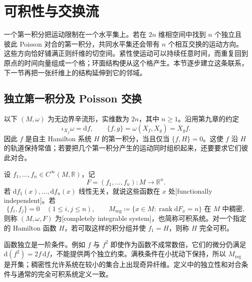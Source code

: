 
% 
% 

\section{可积性与交换流}
\label{g4:sec:1101}

一个第一积分把运动限制在一个水平集上。若在 \(2n\) 维相空间中找到 \(n\) 个独立且彼此 Poisson 对合的第一积分，共同水平集还会带有 \(n\) 个相互交换的运动方向。这些方向恰好铺满正则纤维的切空间。紧性使运动可以持续任意时间，而重复回到原点的时间向量组成一个格；环面结构便从这个格产生。本节逐步建立这条联系，下一节再把一张纤维上的结构延伸到它的邻域。

\subsection{独立第一积分及 Poisson 交换}
\label{g4:subsec:1101:01}

以下 \((M,\omega)\) 为无边界辛流形，实维数为 \(2n\)，其中 \(n\geq1\)。沿用第九章的约定
\[
	\iota_{X_f}\omega=\mathrm{d}f,\qquad
	\{f,g\}=\omega(X_f,X_g)=X_gf.
\]
因此 \(f\) 是自主 Hamilton 系统 \(H\) 的第一积分，当且仅当 \(\{f,H\}=0\)。这使 \(f\) 沿 \(H\) 的轨道保持常值；若要把几个第一积分产生的运动同时组织起来，还要要求它们彼此对合。

\begin{definition}\label{g4:def:1101:integrable-system}
	设 \(f_1,\ldots,f_n\in C^\infty(M,\mathbb R)\)，记
	\[
		F=(f_1,\ldots,f_n):M\longrightarrow\mathbb R^n.
	\]
	若 \(\mathrm{d}f_1(x),\ldots,\mathrm{d}f_n(x)\) 线性无关，就说这些函数在 \(x\) 处[functionally independent]。若
	\begin{equation}\label{g4:eq:1101:integrability}
		\{f_i,f_j\}=0\quad(1\leq i,j\leq n),\qquad
		M_{\mathrm{reg}}\coloneqq\{x\in M:\operatorname{rank}\mathrm{d}F_x=n\}
		\text{ 在 }M\text{ 中稠密},
	\end{equation}
	则称 \((M,\omega,F)\) 为[completely integrable system]，也简称可积系统。对一个指定的 Hamilton 函数 \(H\)，若可取这样的积分组并使 \(f_1=H\)，则称 \(H\) 完全可积。
\end{definition}

函数独立是一阶条件。例如 \(f\) 与 \(f^2\) 即使作为函数不成常数倍，它们的微分仍满足 \(\mathrm{d}(f^2)=2f\,\mathrm{d}f\)，不能提供两个独立约束。满秩条件在小扰动下保持，所以 \(M_{\mathrm{reg}}\) 是开集；稠密性允许系统在较小的集合上出现奇异纤维。定义中的独立性和对合条件与通常的完全可积系统定义一致。\cite[第5.5节，定义5.13，第151页]{Cannas2006Symplectic}

